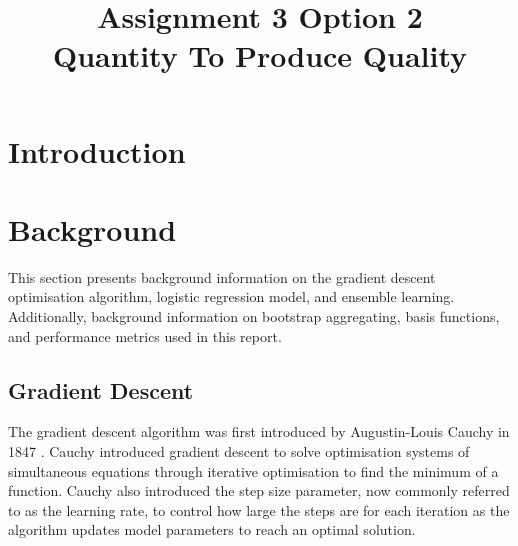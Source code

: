 \documentclass[10pt, conference]{IEEEtran}
\begin{document}
\title{Assignment 3 Option 2 \\
Quantity To Produce Quality
}

\author{
}

\maketitle

\begin{abstract}

\end{abstract}

\section{Introduction}

\section{Background} \label{section: Background}

This section presents background information on the gradient descent optimisation algorithm, logistic
regression model, and ensemble learning. Additionally, background information on bootstrap aggregating,
basis functions, and performance metrics used in this report.

\subsection{Gradient Descent}

The gradient descent algorithm was first introduced by Augustin-Louis Cauchy
in 1847 \cite{gradient_descent_ref}. Cauchy introduced gradient descent to solve optimisation
systems of simultaneous equations through iterative optimisation to find the minimum of a function.
Cauchy also introduced the step size parameter, now commonly referred to as the learning rate, to control
how large the steps are for each iteration as the algorithm updates model parameters to reach an optimal
solution.
\end{document}
